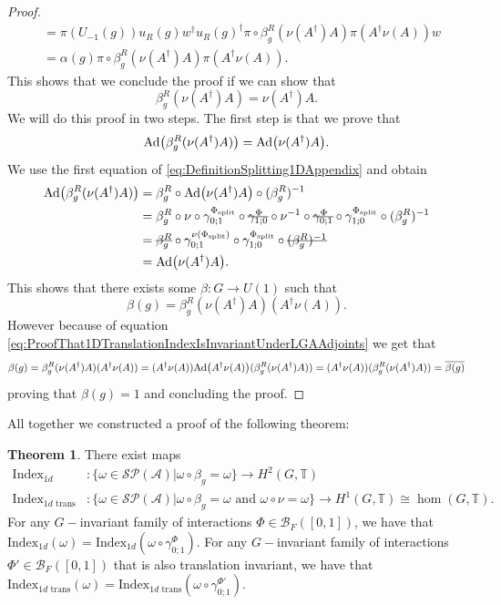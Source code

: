 \documentclass[12pt,a4paper,twoside]{article}
\newcommand{\stkout}[1]{\ifmmode\text{\sout{\ensuremath{#1}}}\else\sout{#1}\fi}
\let\originalleft\left
\let\originalright\right
\renewcommand{\left}{\mathopen{}\mathclose\bgroup\originalleft}
\renewcommand{\right}{\aftergroup\egroup\originalright}
\newcommand{\BB}{\mathcal B}
\newcommand{\PP}{\mathcal P}
\newcommand{\TT}{\mathbb T}
\renewcommand{\AA}{\mathcal A}
\newcommand{\Ad}[1]{\textrm{Ad}\left(#1\right)}
\theoremstyle{definition}
\newtheorem{theorem}{Theorem}[section]
\numberwithin{equation}{section}
\begin{document}
\begin{proof}
\begin{align}
		&=\pi(U_{-1}(g))u_R(g)w^\dagger u_R(g)^\dagger \pi\circ\beta_g^R(\nu(A^\dagger)A)\pi(A^\dagger\nu(A))w\\
		&=\alpha(g)\pi\circ\beta_g^R(\nu(A^\dagger)A)\pi(A^\dagger\nu(A)).
	\end{align}
	This shows that we conclude the proof if we can show that
	\begin{equation}
		\beta_g^R(\nu(A^\dagger)A)=\nu(A^\dagger)A.
	\end{equation}
	We will do this proof in two steps. The first step is that we prove that
	\begin{equation}\label{eq:ProofThat1DTranslationIndexIsInvariantUnderLGAAdjoints}
		\Ad{\beta_g^R(\nu(A^\dagger)A)}=\Ad{\nu(A^\dagger)A}.
	\end{equation}
	We use the first equation of \eqref{eq:DefinitionSplitting1DAppendix} and obtain
	\begin{align}
		\Ad{\beta_g^R(\nu(A^\dagger)A)}&=\beta_g^R\circ\Ad{\nu(A^\dagger)A}\circ(\beta_g^R)^{-1}\\
		&=\beta_g^R\circ\nu\circ\gamma^{\Phi_{\text{split}}}_{0;1}\circ\stkout{\gamma^{\Phi}_{1;0}}\circ\nu^{-1}\circ\stkout{\gamma^{\Phi}_{0;1}}\circ\gamma^{\Phi_{\text{split}}}_{1;0}\circ(\beta_g^R)^{-1}\\
		&=\stkout{\beta_g^R}\circ\gamma^{\nu(\Phi_{\text{split}})}_{0;1}\circ\gamma^{\Phi_{\text{split}}}_{1;0}\circ\stkout{(\beta_g^R)^{-1}}\\
		&=\Ad{\nu(A^\dagger)A}.
	\end{align}
	This shows that there exists some $\beta:G\rightarrow U(1)$ such that
	\begin{equation}
		\beta(g)=\beta_g^R(\nu(A^\dagger)A)(A^\dagger \nu(A)).
	\end{equation}
	However because of equation \eqref{eq:ProofThat1DTranslationIndexIsInvariantUnderLGAAdjoints} we get that
	\begin{equation}
		\beta(g)=\beta_g^R(\nu(A^\dagger)A)(A^\dagger \nu(A))=(A^\dagger \nu(A))\Ad{A^\dagger \nu(A)}(\beta_g^R(\nu(A^\dagger)A))=(A^\dagger \nu(A))(\beta_g^R(\nu(A^\dagger)A))=\overline{\beta(g)}
	\end{equation}
	proving that $\beta(g)=1$ and concluding the proof.
\end{proof}
All together we constructed a proof of the following theorem:
\begin{theorem}
	There exist maps
	\begin{align}
		\textrm{Index}_{1d}&:\{\omega\in\mathcal{S}\PP(\AA)|\omega\circ\beta_g=\omega\}\rightarrow H^2(G,\TT)\\
		\textrm{Index}_{1d\text{ trans}}&:\{\omega\in\mathcal{S}\PP(\AA)|\omega\circ\beta_g=\omega\text{ and }\omega\circ\nu=\omega\}\rightarrow H^1(G,\TT)\cong \hom(G,\TT).
	\end{align}
	For any $G-$invariant family of interactions $\Phi\in\BB_{F}([0,1])$, we have that $\textrm{Index}_{1d}(\omega)=\textrm{Index}_{1d}(\omega\circ\gamma^\Phi_{0;1})$. For any $G-$invariant family of interactions $\Phi'\in\BB_{F}([0,1])$ that is also translation invariant, we have that $\textrm{Index}_{1d\text{ trans}}(\omega)=\textrm{Index}_{1d\text{ trans}}(\omega\circ\gamma^{\Phi'}_{0;1})$.
\end{theorem}
\end{document}
